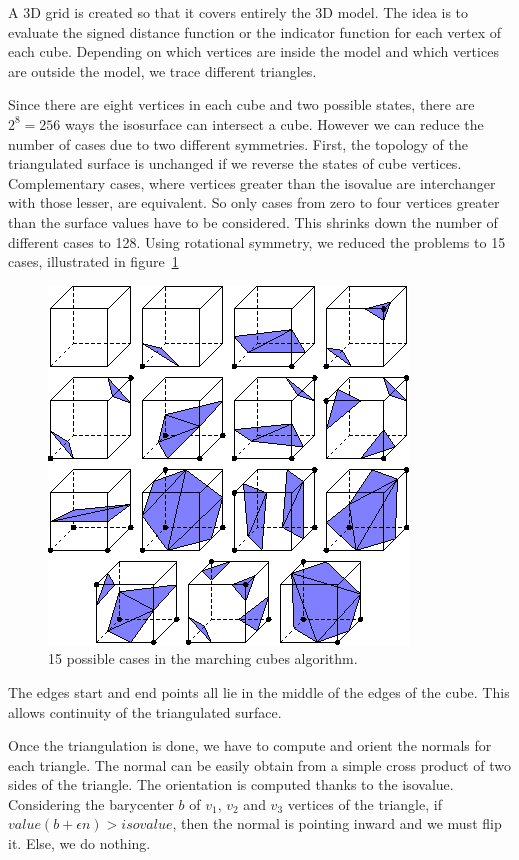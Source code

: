 \documentclass[12pt]{article}
\begin{document}
A 3D grid is created so that it covers entirely the 3D model. The idea is to evaluate the signed distance function or the indicator function for each vertex of each cube. Depending on which vertices are inside the model and which vertices are outside the model, we trace different triangles.

Since there are eight vertices in each cube and two possible states, there are $2^8 = 256$ ways the isosurface can intersect a cube. However we can reduce the number of cases due to two different symmetries. First, the topology of the triangulated surface is unchanged if we reverse the states of cube vertices. Complementary cases, where vertices greater than the isovalue are interchanger with those lesser, are equivalent. So only cases from zero to four vertices greater than the surface values have to be considered. This shrinks down the number of different cases to 128. Using rotational symmetry, we reduced the problems to 15 cases, illustrated in figure~\ref{mcCases}

\begin{figure}[h]
  \centering
  \includegraphics[scale=0.7]{mcCases.png}
  \caption{\label{mcCases} 15 possible cases in the marching cubes algorithm.
}
\end{figure}

The edges start and end points all lie in the middle of the edges of the cube. This allows continuity of the triangulated surface.

Once the triangulation is done, we have to compute and orient the normals for each triangle. The normal can be easily obtain from a simple cross product of two sides of the triangle. The orientation is computed thanks to the isovalue. Considering the barycenter $b$ of $v_1$, $v_2$ and $v_3$ vertices of the triangle, if $value(b + \epsilon n) > isovalue$, then the normal is pointing inward and we must flip it. Else, we do nothing.
\end{document}
